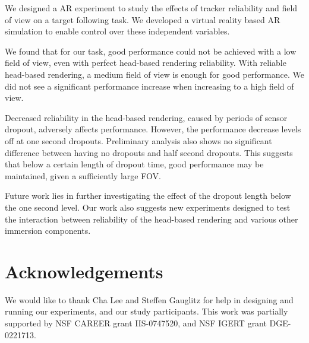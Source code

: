 \documentclass{acmsiggraph}                     %
\begin{document}
We designed a AR experiment to study the effects of tracker reliability and field of view on a target following task.  We developed a virtual reality based AR simulation to enable control over these independent variables.

We found that for our task, good performance could not be achieved with a low field of view, even with perfect head-based rendering reliability.
With reliable head-based rendering, a medium field of view is enough for good performance.  We did not see a significant performance increase when increasing to a high field of view.

Decreased reliability in the head-based rendering, caused by periods of sensor dropout, adversely affects performance.  However, the performance decrease levels off at one second dropouts.  Preliminary analysis also shows no significant difference between having no dropouts and half second dropouts.  This suggests that below a certain length of dropout time, good performance may be maintained, given a sufficiently large FOV.%

Future work lies in further investigating the effect of the dropout length 
below the one second level.  Our work also suggests new experiments designed to test the interaction between reliability of the head-based rendering and various other immersion components.

\section*{Acknowledgements}
We would like to thank Cha Lee and Steffen Gauglitz for help in designing and running our experiments, and our study participants.  This work was partially supported by NSF CAREER grant IIS-0747520, and NSF IGERT grant DGE-0221713.



\end{document}
